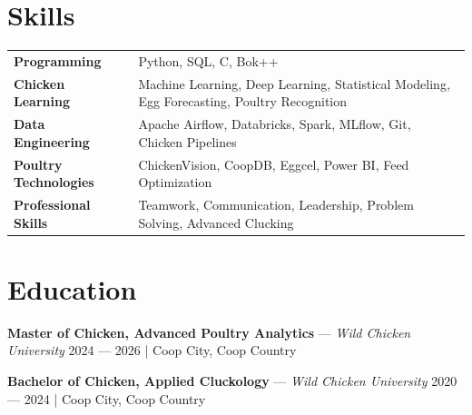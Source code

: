 \documentclass[10pt]{article}
\newcommand{\skills}[1]{{\bfseries #1}}
\begin{document}

\section{Skills}

\begin{tabular}{
    @{}
    p{14em}
    p{\dimexpr\linewidth-14em\relax}
    @{}
}

\skills{Programming}
&
Python, SQL, C, Bok++
\\[0.15em]

\skills{Chicken Learning}
&
Machine Learning, Deep Learning, Statistical Modeling,
Egg Forecasting, Poultry Recognition
\\[0.15em]

\skills{Data Engineering}
&
Apache Airflow, Databricks, Spark, MLflow, Git, Chicken Pipelines
\\[0.15em]

\skills{Poultry Technologies}
&
ChickenVision, CoopDB, Eggcel, Power BI, Feed Optimization
\\[0.15em]

\skills{Professional Skills}
&
Teamwork, Communication, Leadership, Problem Solving,
Advanced Clucking
\\

\end{tabular}


\section{Education}

\textbf{Master of Chicken, Advanced Poultry Analytics}
--- \textit{Wild Chicken University}
\hfill 2024 --- 2026 | Coop City, Coop Country
\vspace{3pt}

\textbf{Bachelor of Chicken, Applied Cluckology}
--- \textit{Wild Chicken University}
\hfill 2020 --- 2024 | Coop City, Coop Country

%
%
%
\end{document}
